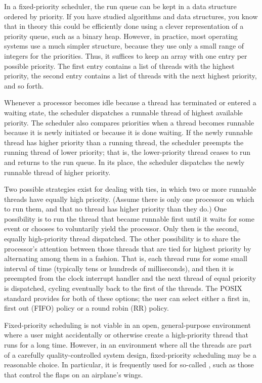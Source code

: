 In a fixed-priority scheduler, the run queue can be kept in a
data structure ordered by priority.  If you have studied algorithms
and data structures, you know that in theory this could be efficiently
done using a clever representation of a priority queue, such as a
binary heap.  However, in practice, most operating systems use a much
simpler structure, because they use only a small range of integers for
the priorities.  Thus, it suffices to keep an array with one entry per
possible priority.  The first entry contains a list of threads with
the highest priority, the second entry contains a list of threads with
the next highest priority, and so forth.

Whenever a processor becomes idle because a thread has terminated or
entered a waiting state, the scheduler dispatches a runnable thread
of highest available priority.  The scheduler also compares priorities when a thread becomes runnable
because it is newly initiated or because it is done waiting.
If the newly runnable thread has higher priority than a running thread, the scheduler preempts the
running thread of lower priority; that is, the lower-priority thread
ceases to run and returns to the run queue.  In its
place, the scheduler dispatches the newly runnable thread of higher
priority.

Two possible strategies exist for dealing with ties, in which two or more
runnable threads have equally high priority.  (Assume there is only
one processor on which to run them, and that no thread has higher priority
than they do.)  One possibility is to run the thread
that became runnable first until it waits for some event or chooses
to voluntarily yield the processor.  Only then is the second, equally
high-priority thread dispatched. The other possibility is to share the
processor's attention between those threads that are tied for highest
priority by alternating among them in a  fashion.  That
is, each thread runs for some small interval of time (typically tens
or hundreds of milliseconds), and then it is preempted from the clock
interrupt handler and the next thread of equal priority is dispatched,
cycling eventually back to the first of the threads.  The POSIX
standard provides for both of these options; the user can select
either a first in, first out (FIFO) policy or a round robin (RR)
policy.

Fixed-priority scheduling is not viable in an open, general-purpose
environment where a user might accidentally or otherwise create a
high-priority thread that runs for a long time.  However, in an
environment where all the threads are part of a carefully
quality-controlled system design, fixed-priority scheduling may be a
reasonable choice.  In particular, it is frequently used for so-called
, such as those that control the flaps on
an airplane's wings.

